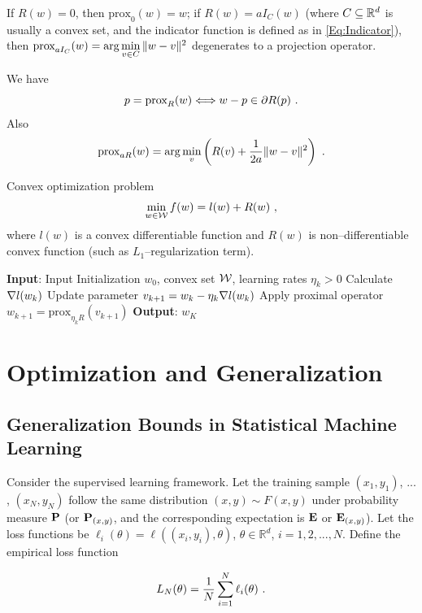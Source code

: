 If $R(w)=0$, then $\text{prox}_0(w)=w$; if $R(w)=aI_C(w)$ (where $C\subseteq \mathbb R^d$ is usually a convex set, and the indicator function is defined as in \eqref{Eq:Indicator}), then $\text{prox}_{a I_C}(w)=\arg\min\limits_{v\in C}\|w-v\|^2$
degenerates to a projection operator. 

We have 
$$p=\text{prox}_R(w) \Longleftrightarrow w-p\in \partial R(p) \ .$$
Also
$$\text{prox}_{aR}(w)=\arg\min\limits_v\left(R(v)+\dfrac{1}{2a}\|w-v\|^2\right) \ .$$

Convex optimization problem
$$\min\limits_{w\in \mathcal W} f(w)=l(w)+R(w) \ ,$$
where $l(w)$ is a convex differentiable function and $R(w)$ is non--differentiable convex function (such as $L_1$--regularization term).

\begin{algorithm}[H]
\caption{Proximal Gradient Descent}
\label{Alg:ProximalGD}
\begin{algorithmic}[1]
\STATE \textbf{Input}: Input Initialization $w_0$, convex set $\mathcal W$, learning rates $\eta_k>0$
    \STATE Calculate $\nabla l(w_k)$
    \STATE Update parameter $v_{k+1}=w_k-\eta_k \nabla l(w_k)$
    \STATE Apply proximal operator $w_{k+1}=\text{prox}_{\eta_k R}(v_{k+1})$
\ENDFOR
\STATE \textbf{Output}: $w_K$
\end{algorithmic}
\end{algorithm}

\section{Optimization and Generalization}
\label{Ch:OptimizationModernML:OptimizationAndGeneralization}

\subsection{Generalization Bounds in Statistical Machine Learning}

Consider the supervised learning framework. Let the training sample
$(x_1, y_1)$, $...$, $(x_N, y_N)$ follow the same distribution $(x,y)\sim F(x,y)$ under probability measure $\mathbf P$
(or $\mathbf P_{(x,y)}$, and the corresponding expectation is $\mathbf E$ or $\mathbf E_{(x,y)}$).
Let the loss functions be
$\ell_i(\theta)=\ell((x_i, y_i), \theta)$, $\theta\in \mathbb{R}^d$, $i=1,2,...,N$.
Define the empirical loss function

\begin{equation}\label{Eq:EmpiricalLossFunction}
L_N(\theta)=\dfrac{1}{N}\sum\limits_{i=1}^N \ell_i(\theta) \ .
\end{equation}

